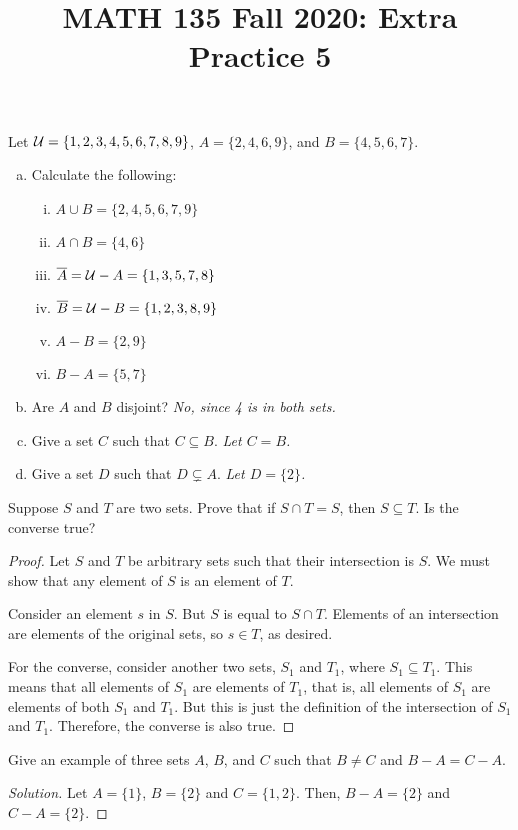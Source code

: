 
\title{MATH 135 Fall 2020: Extra Practice 5}


\thispagestyle{firstpage}

\textbf{\@title}


\question Let $\mathcal{U}=\{1,2,3,4,5,6,7,8,9\}$, $A=\{2,4,6,9\}$, and $B=\{4,5,6,7\}$.
\begin{enumerate}[(a)]
  \item Calculate the following:
        \begin{enumerate}[i.]
          \item $A \cup B = \{2,4,5,6,7,9\}$
          \item $A \cap B = \{4,6\}$
          \item $\overline{A} = \mathcal{U} - A = \{1,3,5,7,8\}$
          \item $\overline{B} = \mathcal{U} - B = \{1,2,3,8,9\}$
          \item $A-B = \{2,9\}$
          \item $B-A = \{5,7\}$
        \end{enumerate}
  \item Are $A$ and $B$ disjoint? \emph{No, since 4 is in both sets.}
  \item Give a set $C$ such that $C \subseteq B$. \emph{Let $C=B$.}
  \item Give a set $D$ such that $D \subsetneq A$. \emph{Let $D=\{2\}$.}
\end{enumerate}

\question Suppose $S$ and $T$ are two sets.
Prove that if $S \cap T = S$, then $S \subseteq T$.
Is the converse true?
\begin{proof}
  Let $S$ and $T$ be arbitrary sets such that their intersection is $S$.
  We must show that any element of $S$ is an element of $T$.

  Consider an element $s$ in $S$.
  But $S$ is equal to $S \cap T$.
  Elements of an intersection are elements of the original sets, so $s \in T$, as desired.

  For the converse, consider another two sets, $S_1$ and $T_1$, where $S_1 \subseteq T_1$.
  This means that all elements of $S_1$ are elements of $T_1$, that is, all elements of $S_1$ are elements of both $S_1$ and $T_1$.
  But this is just the definition of the intersection of $S_1$ and $T_1$.
  Therefore, the converse is also true.
\end{proof}


\question Give an example of three sets $A$, $B$, and $C$ such that $B \neq C$ and $B-A = C-A$.
\begin{proof}[Solution]
  Let $A = \{1\}$, $B=\{2\}$ and $C=\{1,2\}$.
  Then, $B-A=\{2\}$ and $C-A=\{2\}$.
\end{proof}


